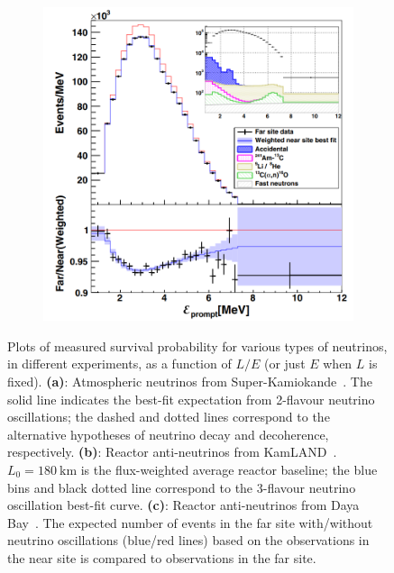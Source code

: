 \begin{figure}
\begin{subfigure}{0.48\textwidth}
        \includegraphics[width=0.95\linewidth]{1_NeutrinoTheory/Figs/dayabay_reactor_e_plot.png}
        \caption{}
        \label{fig:LE_plot_DayaBay}
    \end{subfigure}
    \begin{subfigure}{0.48\textwidth}
        \centering
        \caption{}
        \label{fig:LE_plot_T2K_numu}
    \end{subfigure}
    \caption[]
    {Plots of measured survival probability for various types of neutrinos, in different experiments, as a function of $L/E$ (or just $E$ when $L$ is fixed). \textbf{(a)}: Atmospheric neutrinos from Super-Kamiokande~\cite{ashieEvidenceOscillatorySignature2004}. The solid line indicates the best-fit expectation from 2-flavour neutrino oscillations; the dashed and dotted lines correspond to the alternative hypotheses of neutrino decay and decoherence, respectively. \textbf{(b)}: Reactor anti-neutrinos from KamLAND~\cite{gandoReactorOnoffAntineutrino2013}. $L_{0} = \SI{180}{\km}$ is the flux-weighted average reactor baseline; the blue bins and black dotted line correspond to the 3-flavour neutrino oscillation best-fit curve. \textbf{(c)}: Reactor anti-neutrinos from Daya Bay~\cite{adeyMeasurementElectronAntineutrino2018}. The expected number of events in the far site with/without neutrino oscillations (blue/red lines) based on the observations in the near site is compared to observations in the far site.}
    \label{fig:LE_plots}
\end{figure}

